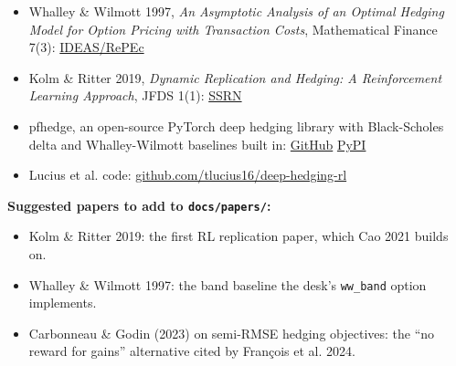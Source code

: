 \documentclass{article}
\begin{document}
\begin{itemize}

\item Whalley \& Wilmott 1997, \emph{An Asymptotic Analysis of an Optimal Hedging Model for Option Pricing with Transaction Costs}, Mathematical Finance 7(3): \href{https://ideas.repec.org/a/bla/mathfi/v7y1997i3p307-324.html}{IDEAS/\allowbreak{}RePEc}

\item Kolm \& Ritter 2019, \emph{Dynamic Replication and Hedging: A Reinforcement Learning Approach}, JFDS 1(1): \href{https://papers.ssrn.com/abstract=3281235}{SSRN}

\item pfhedge, an open-source PyTorch deep hedging library with Black-Scholes delta and Whalley-Wilmott baselines built in: \href{https://github.com/pfnet-research/pfhedge}{GitHub} \textperiodcentered{} \href{https://pypi.org/project/pfhedge}{PyPI}

\item Lucius et al. code: \href{https://github.com/tlucius16/deep-hedging-rl}{github.com/\allowbreak{}tlucius16/\allowbreak{}deep-hedging-rl}

\end{itemize}

\textbf{Suggested papers to add to \texttt{docs/\allowbreak{}papers/\allowbreak{}}:}

\begin{itemize}

\item Kolm \& Ritter 2019: the first RL replication paper, which Cao 2021 builds on.

\item Whalley \& Wilmott 1997: the band baseline the desk's \texttt{ww\_\allowbreak{}band} option implements.

\item Carbonneau \& Godin (2023) on semi-RMSE hedging objectives: the ``no reward for gains'' alternative cited by François et al. 2024.

\end{itemize}
\end{document}
